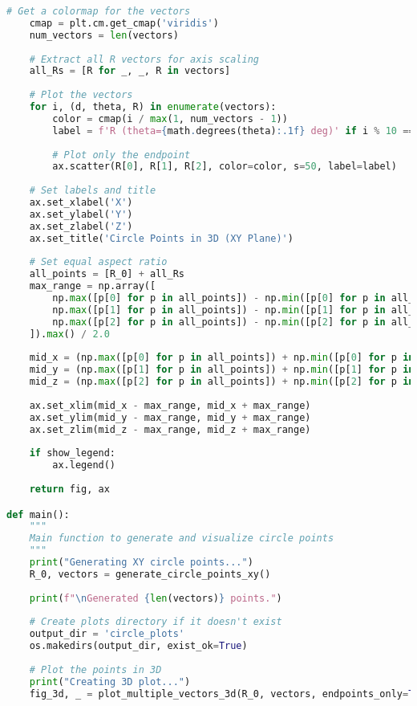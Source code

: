 \begin{lstlisting}[language=Python]
    # Get a colormap for the vectors
    cmap = plt.cm.get_cmap('viridis')
    num_vectors = len(vectors)
    
    # Extract all R vectors for axis scaling
    all_Rs = [R for _, _, R in vectors]
    
    # Plot the vectors
    for i, (d, theta, R) in enumerate(vectors):
        color = cmap(i / max(1, num_vectors - 1))
        label = f'R (theta={math.degrees(theta):.1f} deg)' if i % 10 == 0 else None
        
        # Plot only the endpoint
        ax.scatter(R[0], R[1], R[2], color=color, s=50, label=label)
    
    # Set labels and title
    ax.set_xlabel('X')
    ax.set_ylabel('Y')
    ax.set_zlabel('Z')
    ax.set_title('Circle Points in 3D (XY Plane)')
    
    # Set equal aspect ratio
    all_points = [R_0] + all_Rs
    max_range = np.array([
        np.max([p[0] for p in all_points]) - np.min([p[0] for p in all_points]),
        np.max([p[1] for p in all_points]) - np.min([p[1] for p in all_points]),
        np.max([p[2] for p in all_points]) - np.min([p[2] for p in all_points])
    ]).max() / 2.0
    
    mid_x = (np.max([p[0] for p in all_points]) + np.min([p[0] for p in all_points])) / 2
    mid_y = (np.max([p[1] for p in all_points]) + np.min([p[1] for p in all_points])) / 2
    mid_z = (np.max([p[2] for p in all_points]) + np.min([p[2] for p in all_points])) / 2
    
    ax.set_xlim(mid_x - max_range, mid_x + max_range)
    ax.set_ylim(mid_y - max_range, mid_y + max_range)
    ax.set_zlim(mid_z - max_range, mid_z + max_range)
    
    if show_legend:
        ax.legend()
    
    return fig, ax

def main():
    """
    Main function to generate and visualize circle points
    """
    print("Generating XY circle points...")
    R_0, vectors = generate_circle_points_xy()
    
    print(f"\nGenerated {len(vectors)} points.")
    
    # Create plots directory if it doesn't exist
    output_dir = 'circle_plots'
    os.makedirs(output_dir, exist_ok=True)
    
    # Plot the points in 3D
    print("Creating 3D plot...")
    fig_3d, _ = plot_multiple_vectors_3d(R_0, vectors, endpoints_only=True)
    

\end{lstlisting}
